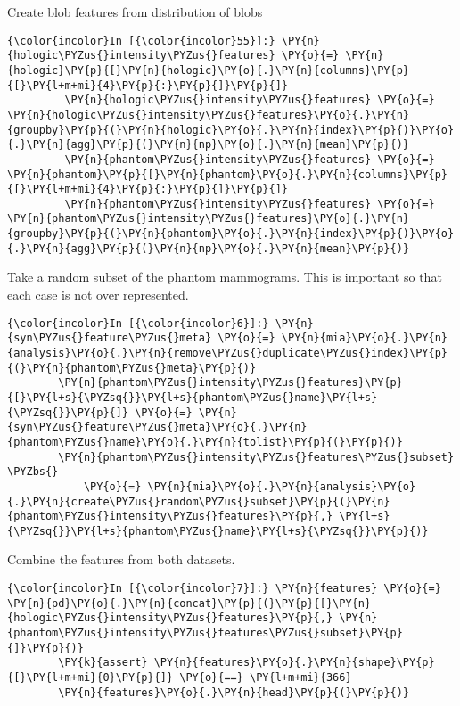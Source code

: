     Create blob features from distribution of blobs

    \begin{Verbatim}[commandchars=\\\{\}]
{\color{incolor}In [{\color{incolor}55}]:} \PY{n}{hologic\PYZus{}intensity\PYZus{}features} \PY{o}{=} \PY{n}{hologic}\PY{p}{[}\PY{n}{hologic}\PY{o}{.}\PY{n}{columns}\PY{p}{[}\PY{l+m+mi}{4}\PY{p}{:}\PY{p}{]}\PY{p}{]}
         \PY{n}{hologic\PYZus{}intensity\PYZus{}features} \PY{o}{=} \PY{n}{hologic\PYZus{}intensity\PYZus{}features}\PY{o}{.}\PY{n}{groupby}\PY{p}{(}\PY{n}{hologic}\PY{o}{.}\PY{n}{index}\PY{p}{)}\PY{o}{.}\PY{n}{agg}\PY{p}{(}\PY{n}{np}\PY{o}{.}\PY{n}{mean}\PY{p}{)}
         \PY{n}{phantom\PYZus{}intensity\PYZus{}features} \PY{o}{=} \PY{n}{phantom}\PY{p}{[}\PY{n}{phantom}\PY{o}{.}\PY{n}{columns}\PY{p}{[}\PY{l+m+mi}{4}\PY{p}{:}\PY{p}{]}\PY{p}{]}
         \PY{n}{phantom\PYZus{}intensity\PYZus{}features} \PY{o}{=} \PY{n}{phantom\PYZus{}intensity\PYZus{}features}\PY{o}{.}\PY{n}{groupby}\PY{p}{(}\PY{n}{phantom}\PY{o}{.}\PY{n}{index}\PY{p}{)}\PY{o}{.}\PY{n}{agg}\PY{p}{(}\PY{n}{np}\PY{o}{.}\PY{n}{mean}\PY{p}{)}
\end{Verbatim}

    Take a random subset of the phantom mammograms. This is important so
that each case is not over represented.

    \begin{Verbatim}[commandchars=\\\{\}]
{\color{incolor}In [{\color{incolor}6}]:} \PY{n}{syn\PYZus{}feature\PYZus{}meta} \PY{o}{=} \PY{n}{mia}\PY{o}{.}\PY{n}{analysis}\PY{o}{.}\PY{n}{remove\PYZus{}duplicate\PYZus{}index}\PY{p}{(}\PY{n}{phantom\PYZus{}meta}\PY{p}{)}
        \PY{n}{phantom\PYZus{}intensity\PYZus{}features}\PY{p}{[}\PY{l+s}{\PYZsq{}}\PY{l+s}{phantom\PYZus{}name}\PY{l+s}{\PYZsq{}}\PY{p}{]} \PY{o}{=} \PY{n}{syn\PYZus{}feature\PYZus{}meta}\PY{o}{.}\PY{n}{phantom\PYZus{}name}\PY{o}{.}\PY{n}{tolist}\PY{p}{(}\PY{p}{)}
        \PY{n}{phantom\PYZus{}intensity\PYZus{}features\PYZus{}subset} \PYZbs{}
            \PY{o}{=} \PY{n}{mia}\PY{o}{.}\PY{n}{analysis}\PY{o}{.}\PY{n}{create\PYZus{}random\PYZus{}subset}\PY{p}{(}\PY{n}{phantom\PYZus{}intensity\PYZus{}features}\PY{p}{,} \PY{l+s}{\PYZsq{}}\PY{l+s}{phantom\PYZus{}name}\PY{l+s}{\PYZsq{}}\PY{p}{)}
\end{Verbatim}

    Combine the features from both datasets.

    \begin{Verbatim}[commandchars=\\\{\}]
{\color{incolor}In [{\color{incolor}7}]:} \PY{n}{features} \PY{o}{=} \PY{n}{pd}\PY{o}{.}\PY{n}{concat}\PY{p}{(}\PY{p}{[}\PY{n}{hologic\PYZus{}intensity\PYZus{}features}\PY{p}{,} \PY{n}{phantom\PYZus{}intensity\PYZus{}features\PYZus{}subset}\PY{p}{]}\PY{p}{)}
        \PY{k}{assert} \PY{n}{features}\PY{o}{.}\PY{n}{shape}\PY{p}{[}\PY{l+m+mi}{0}\PY{p}{]} \PY{o}{==} \PY{l+m+mi}{366}
        \PY{n}{features}\PY{o}{.}\PY{n}{head}\PY{p}{(}\PY{p}{)}
\end{Verbatim}

